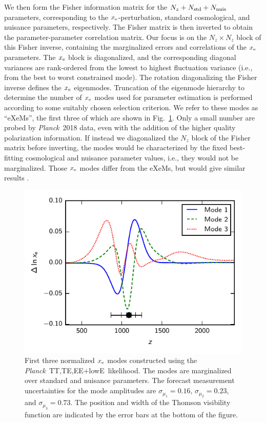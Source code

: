 \documentclass[longauth,traditabstract]{aa}
\def\Planck{\textit{Planck}}
\newcommand{\mksym}[1]{\ifmmode {\rm #1}\else #1\fi}
\newcommand{\dataplus}{\allowbreak+}
\newcommand{\TTTEEE}{\mksym{TT,TE,EE}}
\newcommand{\planckTTTEEEonly}{\planck\ \TTTEEE}
\newcommand{\lowE}{\mksym{lowE}}
\newcommand{\planckall}{\planckTTTEEEonly\dataplus\lowE}
\newcommand{\planck}{\Planck}
\begin{document}
 We then form the Fisher information matrix for the $N_z+N_{\rm
std}+N_{\rm nuis}$ parameters, corresponding to the
$x_{\rm e}$-perturbation, standard cosmological, and nuisance
parameters, respectively. The Fisher matrix is then inverted to obtain
the parameter-parameter correlation matrix. Our focus is on the
$N_z \times N_z$ block of this Fisher inverse, containing the
marginalized errors and correlations of the $x_{\rm e}$ parameters.
The $x_{\rm e}$ block is diagonalized, and the corresponding diagonal
variances are rank-ordered from the lowest to highest fluctuation
variance (i.e., from the best to worst constrained mode). The rotation
diagonalizing the Fisher inverse defines the $x_{\rm e}$
eigenmodes. Truncation of the eigenmode hierarchy to determine the
number of $x_{\rm e}$ modes used for parameter estimation is performed
according to some suitably chosen selection criterion.  We refer to
these modes as ``eXeMs'', the first three of which are shown in
Fig.~\ref{fig:eXeM}. Only a small number are probed by \Planck\ 2018
data, even with the addition of the higher quality polarization
information. If instead we diagonalized the $N_z$ block of the Fisher
matrix before inverting, the modes would be characterized by the fixed
best-fitting cosmological and nuisance parameter values, i.e., they
would not be marginalized. Those $x_{\rm e}$ modes differ from the
eXeMs, but would give similar results \citep[as discussed
in][]{Farhang2011}.

 \begin{figure}
\begin{center}
\includegraphics[width=\columnwidth]{recombination_xe-modes.pdf}
\end{center}
\caption{First three normalized $x_{\rm e}$ modes constructed using the \planckall\ likelihood. The modes are marginalized over standard and
nuisance parameters. The forecast measurement uncertainties for the mode amplitudes are $\sigma_{\mu_1}=0.16$, $\sigma_{\mu_2}=0.23$, and $\sigma_{\mu_3}=0.73$. The position and width of the Thomson visibility function are indicated by the error bars at the bottom of the figure.}
\label{fig:eXeM}
\end{figure}
\end{document}

